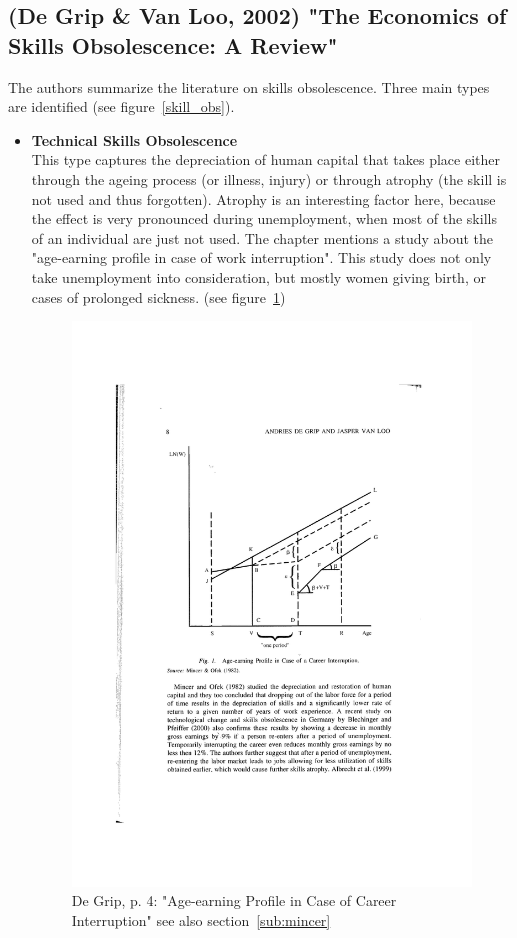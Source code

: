 \documentclass[12pt,a4paper]{article}
\begin{document}
  \subsection{(De Grip \& Van Loo, 2002) "The Economics of Skills Obsolescence: A Review"} %
  \label{sub:grip}
  The authors summarize the literature on skills obsolescence. Three main types are identified (see figure~\ref{skill_obs}).
  \begin{itemize}
    \item  \textbf{Technical Skills Obsolescence}\\
    This type captures the depreciation of human capital that takes place either through the ageing process
    (or illness, injury) or through atrophy (the skill is not used and thus forgotten). Atrophy is an interesting factor here,
    because the effect is very pronounced during unemployment, when most of the skills of an individual are just not used. The
    chapter mentions a study about the "age-earning profile in case of work interruption". This study does not only take unemployment
    into consideration, but mostly women giving birth, or cases of prolonged sickness. (see figure~\ref{age_earn})

    \begin{figure}[htb]
      \centering
      \includegraphics[width=12cm]{age_earn.pdf}
      \caption{De Grip, p. 4: "Age-earning Profile in Case of Career Interruption" see also section~\ref{sub:mincer}}
      \label{age_earn}
    \end{figure}


\end{itemize}
\end{document}
